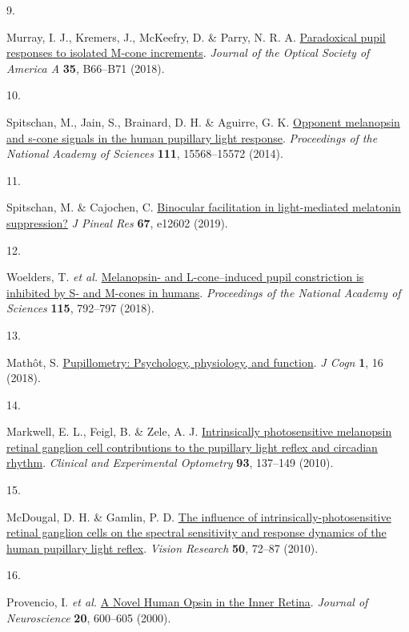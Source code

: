 \documentclass[
]{article}
\newlength{\cslhangindent}
\newlength{\csllabelwidth}
\newenvironment{CSLReferences}[2] %
 {\begin{list}{}{%
  \setlength{\itemindent}{0pt}
  \setlength{\leftmargin}{0pt}
  \setlength{\parsep}{0pt}
  \ifodd #1
   \setlength{\leftmargin}{\cslhangindent}
   \setlength{\itemindent}{-1\cslhangindent}
  \fi
  \setlength{\itemsep}{#2\baselineskip}}}
 {\end{list}}
\newcommand{\CSLLeftMargin}[1]{\parbox[t]{\csllabelwidth}{\strut#1\strut}}
\newcommand{\CSLRightInline}[1]{\parbox[t]{\linewidth - \csllabelwidth}{\strut#1\strut}}
\begin{document}
\begin{CSLReferences}{0}{0}
\CSLLeftMargin{9. }%
\CSLRightInline{Murray, I. J., Kremers, J., McKeefry, D. \& Parry, N. R. A. \href{https://doi.org/10.1364/JOSAA.35.000B66}{Paradoxical pupil responses to isolated {M}-cone increments}. \emph{Journal of the Optical Society of America A} \textbf{35}, B66--B71 (2018).}

\CSLLeftMargin{10. }%
\CSLRightInline{Spitschan, M., Jain, S., Brainard, D. H. \& Aguirre, G. K. \href{https://doi.org/10.1073/pnas.1400942111}{Opponent melanopsin and s-cone signals in the human pupillary light response}. \emph{Proceedings of the National Academy of Sciences} \textbf{111}, 15568--15572 (2014).}

\CSLLeftMargin{11. }%
\CSLRightInline{Spitschan, M. \& Cajochen, C. \href{https://doi.org/10.1111/jpi.12602}{Binocular facilitation in light-mediated melatonin suppression?} \emph{J Pineal Res} \textbf{67}, e12602 (2019).}

\CSLLeftMargin{12. }%
\CSLRightInline{Woelders, T. \emph{et al.} \href{https://doi.org/10.1073/pnas.1716281115}{Melanopsin- and {L}-cone--induced pupil constriction is inhibited by {S}- and {M}-cones in humans}. \emph{Proceedings of the National Academy of Sciences} \textbf{115}, 792--797 (2018).}

\CSLLeftMargin{13. }%
\CSLRightInline{Mathôt, S. \href{https://doi.org/10.5334/joc.18}{Pupillometry: Psychology, physiology, and function}. \emph{J Cogn} \textbf{1}, 16 (2018).}

\CSLLeftMargin{14. }%
\CSLRightInline{Markwell, E. L., Feigl, B. \& Zele, A. J. \href{https://doi.org/10.1111/j.1444-0938.2010.00479.x}{Intrinsically photosensitive melanopsin retinal ganglion cell contributions to the pupillary light reflex and circadian rhythm}. \emph{Clinical and Experimental Optometry} \textbf{93}, 137--149 (2010).}

\CSLLeftMargin{15. }%
\CSLRightInline{McDougal, D. H. \& Gamlin, P. D. \href{https://doi.org/10.1016/j.visres.2009.10.012}{The influence of intrinsically-photosensitive retinal ganglion cells on the spectral sensitivity and response dynamics of the human pupillary light reflex}. \emph{Vision Research} \textbf{50}, 72--87 (2010).}

\CSLLeftMargin{16. }%
\CSLRightInline{Provencio, I. \emph{et al.} \href{https://doi.org/10.1523/JNEUROSCI.20-02-00600.2000}{A {Novel} {Human} {Opsin} in the {Inner} {Retina}}. \emph{Journal of Neuroscience} \textbf{20}, 600--605 (2000).}


\end{CSLReferences}
\end{document}
